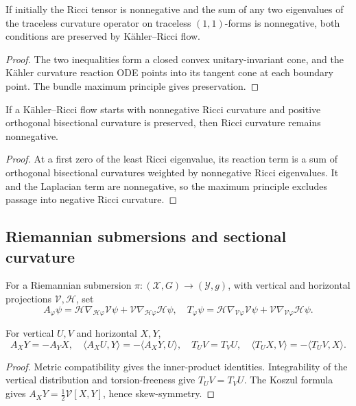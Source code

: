\begin{example}
\label{ex:chow-ii-traceless-kahler-curvature-preserved}
If initially the Ricci tensor is nonnegative and the sum of any two
eigenvalues of the traceless curvature operator on traceless \((1,1)\)-forms
is nonnegative, both conditions are preserved by Kähler--Ricci flow.
\end{example}
\begin{proof}
\sketch
{}
The two inequalities form a closed convex unitary-invariant cone, and the
Kähler curvature reaction ODE points into its tangent cone at each boundary
point.  The bundle maximum principle gives preservation.
\end{proof}

\begin{example}
\label{ex:chow-ii-orthogonal-bisectional-preserves-ricci}
If a Kähler--Ricci flow starts with nonnegative Ricci curvature and positive
orthogonal bisectional curvature is preserved, then Ricci curvature remains
nonnegative.
\end{example}
\begin{proof}
\sketch
At a first zero of the least Ricci eigenvalue, its reaction term is a sum of
orthogonal bisectional curvatures weighted by nonnegative Ricci eigenvalues.
It and the Laplacian term are nonnegative, so the maximum principle excludes
passage into negative Ricci curvature.
\end{proof}

\subsection{Riemannian submersions and sectional curvature}

For a Riemannian submersion \(\pi:(\mathcal X,G)\to(\mathcal Y,g)\), with
vertical and horizontal projections \(\mathcal V,\mathcal H\), set
\[
 A_\varphi\psi=\mathcal H\nabla_{\mathcal H\varphi}\mathcal V\psi
 +\mathcal V\nabla_{\mathcal H\varphi}\mathcal H\psi,
 \quad
 T_\varphi\psi=\mathcal H\nabla_{\mathcal V\varphi}\mathcal V\psi
 +\mathcal V\nabla_{\mathcal V\varphi}\mathcal H\psi.
\]

\begin{example}
\label{ex:chow-ii-oneill-tensor-symmetries}
For vertical \(U,V\) and horizontal \(X,Y\),
\[
 A_XY=-A_YX,\quad \langle A_XU,Y\rangle=-\langle A_XY,U\rangle,
\quad T_UV=T_VU,\quad
\langle T_UX,V\rangle=-\langle T_UV,X\rangle.
\]
\end{example}
\begin{proof}
\sketch
Metric compatibility gives the inner-product identities.  Integrability of
the vertical distribution and torsion-freeness give \(T_UV=T_VU\).  The
Koszul formula gives \(A_XY=\tfrac12\mathcal V[X,Y]\), hence skew-symmetry.
\end{proof}

